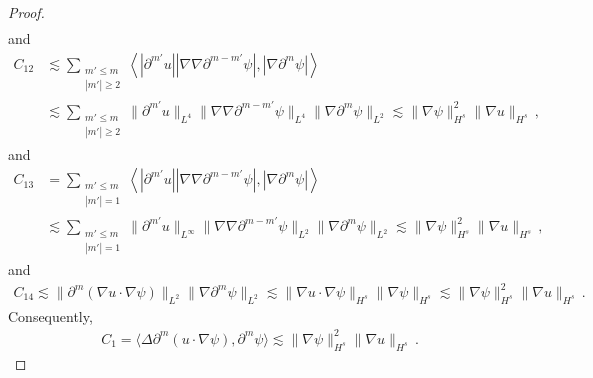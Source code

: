 \documentclass[10pt,a4paper]{amsart}
\def\p{\partial}
\begin{document}
\begin{proof}
\begin{equation*}
\begin{aligned}
\end{aligned}
\end{equation*}
and
\begin{equation*}
\begin{aligned}
C_{12}&\lesssim\sum_{\substack{m' \leq m \\ |m'| \geq 2}} \left\langle |\partial^{m'} u| |\nabla \nabla \partial^{m - m'} \psi|, |\nabla \partial^m \psi| \right\rangle\\&
\lesssim \sum_{\substack{m' \leq m \\ |m'| \geq 2}} \|\partial^{m'} u\|_{L^4} \|\nabla \nabla \partial^{m - m'} \psi\|_{L^4} \|\nabla \partial^m \psi\|_{L^2} \lesssim \|\nabla \psi\|_{H^s}^2 \|\nabla u\|_{H^s} \,,
\end{aligned}
\end{equation*}
and
\begin{equation*}
\begin{aligned}
C_{13}&=\sum_{\substack{m' \leq m \\ |m'| = 1}} \left\langle |\partial^{m'} u| |\nabla \nabla \partial^{m - m'} \psi|, |\nabla \partial^m \psi| \right\rangle\\&
\lesssim \sum_{\substack{m' \leq m \\ |m'| = 1}}\|\partial^{m'} u\|_{L^\infty}\|\nabla \nabla \partial^{m - m'} \psi\|_{L^2}\|\nabla \partial^m \psi\|_{L^2} \lesssim\|\nabla \psi\|^2_{H^s}\|\nabla u\|_{H^s} \,,
\end{aligned}
\end{equation*}
and
\begin{equation*}
\begin{aligned}
C_{14} \lesssim \| \p^m ( \nabla u \cdot \nabla \psi ) \|_{L^2} \| \nabla \p^m \psi \|_{L^2} \lesssim \| \nabla u \cdot \nabla \psi \|_{H^s} \| \nabla \psi \|_{H^s} \lesssim \| \nabla \psi \|^2_{H^s} \| \nabla u \|_{H^s} \,.
\end{aligned}
\end{equation*}
Consequently,
\begin{equation}\label{gpsi-eq5}
\begin{aligned}
C_1=\langle \Delta\p^m(u\cdot\nabla\psi),\p^m\psi   \rangle\lesssim\|\nabla\psi\|^2_{H^s}\|\nabla u\|_{H^s} \,.
\end{aligned}
\end{equation}


\end{proof}
\end{document}
